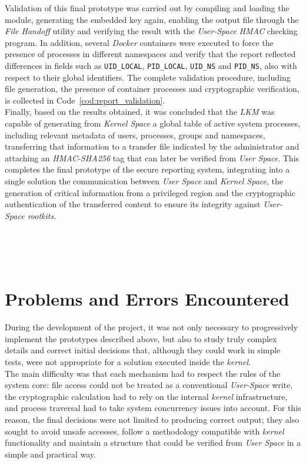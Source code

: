 Validation of this final prototype was carried out by compiling and loading the module, generating the embedded key again, enabling the output file through the \textit{File Handoff} utility and verifying the result with the \textit{User-Space} \textit{HMAC} checking program.
In addition, several \textit{Docker} containers were executed to force the presence of processes in different namespaces and verify that the report reflected differences in fields such as \texttt{UID\_LOCAL}, \texttt{PID\_LOCAL}, \texttt{UID\_NS} and \texttt{PID\_NS}, also with respect to their global identifiers.
The complete validation procedure, including file generation, the presence of container processes and cryptographic verification, is collected in Code~\ref{cod:report_validation}.\\

Finally, based on the results obtained, it was concluded that the \textit{LKM} was capable of generating from \textit{Kernel Space} a global table of active system processes, including relevant metadata of users, processes, groups and namespaces, transferring that information to a transfer file indicated by the administrator and attaching an \textit{HMAC-SHA256} tag that can later be verified from \textit{User Space}.
This completes the final prototype of the secure reporting system, integrating into a single solution the communication between \textit{User Space} and \textit{Kernel Space}, the generation of critical information from a privileged region and the cryptographic authentication of the transferred content to ensure its integrity against \textit{User-Space rootkits}.\\\\

\

\

\section{Problems and Errors Encountered}
\label{sec:problemas-errores}

During the development of the project, it was not only necessary to progressively implement the prototypes described above, but also to study truly complex details and correct initial decisions that, although they could work in simple tests, were not appropriate for a solution executed inside the \textit{kernel}.\\

The main difficulty was that each mechanism had to respect the rules of the system core: file access could not be treated as a conventional \textit{User-Space} write, the cryptographic calculation had to rely on the internal \textit{kernel} infrastructure, and process traversal had to take system concurrency issues into account.
For this reason, the final decisions were not limited to producing correct output; they also sought to avoid unsafe accesses, follow a methodology compatible with \textit{kernel} functionality and maintain a structure that could be verified from \textit{User Space} in a simple and practical way.\\

